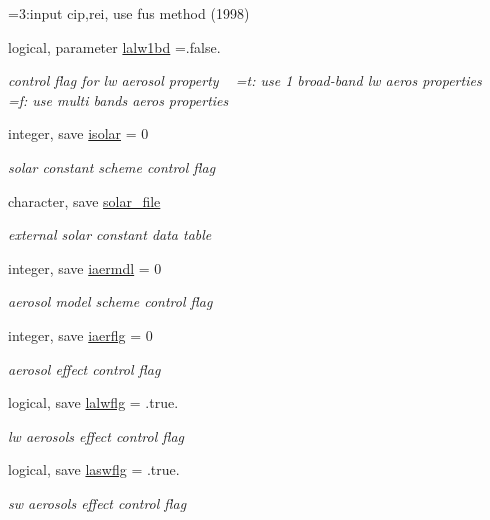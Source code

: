 \begin{DoxyCompactItemize}
\begin{DoxyCompactList}
 =3\+:input cip,rei, use fu\textquotesingle{}s method (1998) \end{DoxyCompactList}\item 
logical, parameter \hyperlink{namespacephysparam_a7ca56a779d7583fcd17b538bf6eb8a84}{lalw1bd} =.false.
\begin{DoxyCompactList}\small\item\em control flag for lw aerosol property ~\newline
 =t\+: use 1 broad-\/band lw aeros properties ~\newline
 =f\+: use multi bands aeros properties \end{DoxyCompactList}\item 
integer, save \hyperlink{namespacephysparam_adf09a9ec1939f1ee47bb4190a9098941}{isolar} = 0
\begin{DoxyCompactList}\small\item\em solar constant scheme control flag \end{DoxyCompactList}\item 
character, save \hyperlink{namespacephysparam_a6472b7762518054a168d4aa915da38f8}{solar\+\_\+file}
\begin{DoxyCompactList}\small\item\em external solar constant data table \end{DoxyCompactList}\item 
integer, save \hyperlink{namespacephysparam_a6fe54722a9d657514d7e4df8f49395fc}{iaermdl} = 0
\begin{DoxyCompactList}\small\item\em aerosol model scheme control flag \end{DoxyCompactList}\item 
integer, save \hyperlink{namespacephysparam_a2b30f07ca3fb04fbfff8c01eb8082e8d}{iaerflg} = 0
\begin{DoxyCompactList}\small\item\em aerosol effect control flag \end{DoxyCompactList}\item 
logical, save \hyperlink{namespacephysparam_aeec2f09912564e297253bf32bf362928}{lalwflg} = .true.
\begin{DoxyCompactList}\small\item\em lw aerosols effect control flag \end{DoxyCompactList}\item 
logical, save \hyperlink{namespacephysparam_aed1b9ce25d416e9149353f2075030bfa}{laswflg} = .true.
\begin{DoxyCompactList}\small\item\em sw aerosols effect control flag \end{DoxyCompactList}\item 

\end{DoxyCompactItemize}
